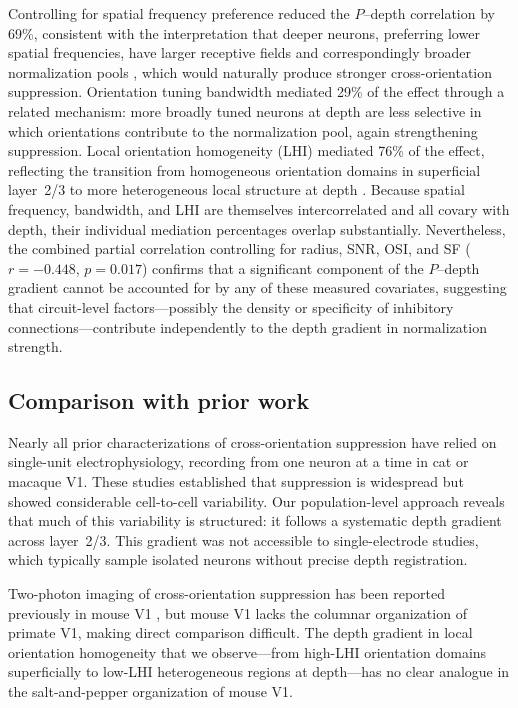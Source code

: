 \documentclass[11pt,letterpaper]{article}
\begin{document}
Controlling for spatial frequency preference reduced the $P$--depth
correlation by 69\%, consistent with the interpretation that deeper neurons,
preferring lower spatial frequencies, have larger receptive fields and
correspondingly broader normalization pools \citep{devries1982, sceniak1999},
which would naturally produce stronger cross-orientation suppression.
Orientation tuning bandwidth mediated 29\% of the effect through a related
mechanism: more broadly tuned neurons at depth are less selective in which
orientations contribute to the normalization pool, again strengthening
suppression. Local orientation homogeneity (LHI) mediated 76\% of the
effect, reflecting the transition from homogeneous orientation domains in
superficial layer~2/3 to more heterogeneous local structure at depth
\citep{nauhaus2008}. Because spatial frequency, bandwidth, and LHI are
themselves intercorrelated and all covary with depth, their individual
mediation percentages overlap substantially. Nevertheless, the combined
partial correlation controlling for radius, SNR, OSI, and SF
($r = -0.448$, $p = 0.017$) confirms that a significant component of the
$P$--depth gradient cannot be accounted for by any of these measured
covariates, suggesting that circuit-level factors---possibly the density or
specificity of inhibitory connections---contribute independently to the
depth gradient in normalization strength.

\subsection{Comparison with prior work}

Nearly all prior characterizations of cross-orientation suppression have
relied on single-unit electrophysiology, recording from one neuron at a
time in cat \citep{morrone1982, bonds1989, deangelis1992} or macaque
\citep{carandini1997, smith2006} V1. These studies established that
suppression is widespread but showed considerable cell-to-cell variability.
Our population-level approach reveals that much of this variability is
structured: it follows a systematic depth gradient across layer~2/3. This
gradient was not accessible to single-electrode studies, which typically
sample isolated neurons without precise depth registration.

Two-photon imaging of cross-orientation suppression has been reported
previously in mouse V1 \citep{busse2009}, but mouse V1 lacks the columnar
organization of primate V1, making direct comparison difficult. The depth
gradient in local orientation homogeneity that we observe---from
high-LHI orientation domains superficially to low-LHI heterogeneous
regions at depth---has no clear analogue in the salt-and-pepper
organization of mouse V1.
\end{document}
